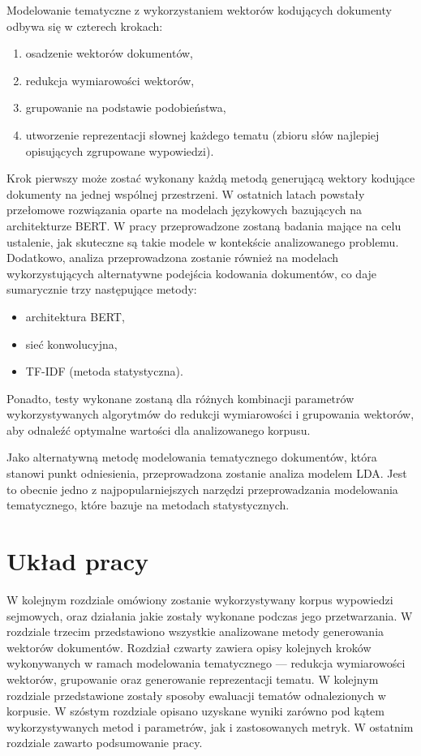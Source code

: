 	Modelowanie tematyczne z wykorzystaniem wektorów kodujących dokumenty odbywa się w czterech krokach:
	\begin{enumerate}
		\item osadzenie wektorów dokumentów,
		\item redukcja wymiarowości wektorów,
		\item grupowanie na podstawie podobieństwa,
		\item utworzenie reprezentacji słownej każdego tematu (zbioru słów najlepiej opisujących zgrupowane wypowiedzi).
	\end{enumerate}
	Krok pierwszy może zostać wykonany każdą metodą generującą wektory kodujące dokumenty na jednej wspólnej przestrzeni.
	W ostatnich latach powstały przełomowe rozwiązania oparte na modelach językowych bazujących na architekturze BERT\@.
	W pracy przeprowadzone zostaną badania mające na celu ustalenie, jak skuteczne są takie modele w kontekście analizowanego problemu.
	Dodatkowo, analiza przeprowadzona zostanie również na modelach wykorzystujących alternatywne podejścia kodowania dokumentów,
		co daje sumarycznie trzy następujące metody:
	\begin{itemize}
		\item architektura BERT,
		\item sieć konwolucyjna,
		\item TF-IDF (metoda statystyczna).
	\end{itemize}
	Ponadto, testy wykonane zostaną dla różnych kombinacji parametrów wykorzystywanych algorytmów do redukcji wymiarowości i grupowania wektorów,
		aby odnaleźć optymalne wartości dla analizowanego korpusu.

	Jako alternatywną metodę modelowania tematycznego dokumentów, która stanowi punkt odniesienia,
		przeprowadzona zostanie analiza modelem LDA\@.
	Jest to obecnie jedno z najpopularniejszych narzędzi przeprowadzania modelowania tematycznego\cite{LDA_popularity},
		które bazuje na metodach statystycznych.

\section{Układ pracy}
	W kolejnym rozdziale omówiony zostanie wykorzystywany korpus wypowiedzi sejmowych,
		oraz działania jakie zostały wykonane podczas jego przetwarzania.
	W rozdziale trzecim przedstawiono wszystkie analizowane metody generowania wektorów dokumentów.
	Rozdział czwarty zawiera opisy kolejnych kroków wykonywanych w ramach modelowania tematycznego
		--- redukcja wymiarowości wektorów, grupowanie oraz generowanie reprezentacji tematu.
	W kolejnym rozdziale przedstawione zostały sposoby ewaluacji tematów odnalezionych w korpusie.
	W szóstym rozdziale opisano uzyskane wyniki zarówno pod kątem wykorzystywanych metod i parametrów, jak i zastosowanych metryk.
	W ostatnim rozdziale zawarto podsumowanie pracy.